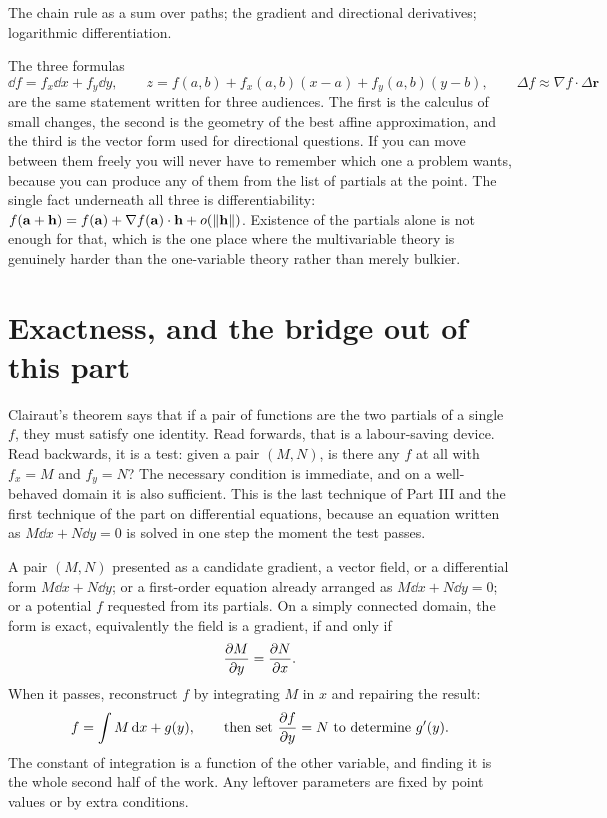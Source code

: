 \begin{seealsob}The chain rule as a sum over paths; the gradient and directional derivatives; logarithmic differentiation.\end{seealsob}

\begin{keynote}
The three formulas
\[
\dd f=f_{x}\dd x+f_{y}\dd y,\qquad
z=f(a,b)+f_{x}(a,b)(x-a)+f_{y}(a,b)(y-b),\qquad
\Delta f\approx\nabla f\cdot\Delta\mathbf r
\]
are the same statement written for three audiences. The first is the calculus of small changes, the second is the geometry of the best affine approximation, and the third is the vector form used for directional questions. If you can move between them freely you will never have to remember which one a problem wants, because you can produce any of them from the list of partials at the point. The single fact underneath all three is differentiability: $f(\mathbf a+\mathbf h)=f(\mathbf a)+\nabla f(\mathbf a)\cdot\mathbf h+o(\left\lVert \mathbf h\right\rVert)$. Existence of the partials alone is not enough for that, which is the one place where the multivariable theory is genuinely harder than the one-variable theory rather than merely bulkier.
\end{keynote}

\section{Exactness, and the bridge out of this part}

Clairaut's theorem says that if a pair of functions are the two partials of a single $f$, they must satisfy one identity. Read forwards, that is a labour-saving device. Read backwards, it is a test: given a pair $(M,N)$, is there any $f$ at all with $f_{x}=M$ and $f_{y}=N$? The necessary condition is immediate, and on a well-behaved domain it is also sufficient. This is the last technique of Part III and the first technique of the part on differential equations, because an equation written as $M\dd x+N\dd y=0$ is solved in one step the moment the test passes.

\cue A pair $(M,N)$ presented as a candidate gradient, a vector field, or a differential form $M\dd x+N\dd y$; or a first-order equation already arranged as $M\dd x+N\dd y=0$; or a potential $f$ requested from its partials.
\method On a simply connected domain, the form is exact, equivalently the field is a gradient, if and only if
\[
\frac{\partial M}{\partial y}=\frac{\partial N}{\partial x} .
\]
When it passes, reconstruct $f$ by integrating $M$ in $x$ and repairing the result:
\[
f=\int M\,\mathrm{d} x+g(y),\qquad\text{then set } \frac{\partial f}{\partial y}=N \text{ to determine } g'(y).
\]
The constant of integration is a function of the other variable, and finding it is the whole second half of the work. Any leftover parameters are fixed by point values or by extra conditions.

